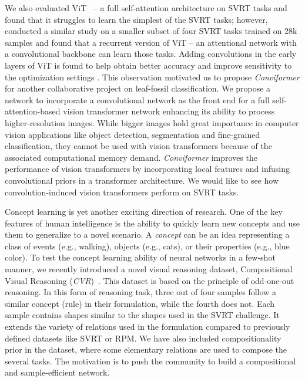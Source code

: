 We also evaluated ViT~\citep{Dosovitskiy2020-iq} -- a full self-attention architecture on SVRT tasks and found that it struggles to learn the simplest of the SVRT tasks; however, \citet{messina2021recurrent} conducted a similar study on a smaller subset of four SVRT tasks trained on 28k samples and found that a recurrent version of ViT -- an attentional network with a convolutional backbone can learn those tasks. Adding convolutions in the early layers of ViT is found to help obtain better accuracy and improve sensitivity to the optimization settings \citep{xiao2021early}. This observation motivated us to propose \textit{Conviformer} \citep{vaishnav2022conviformers} for another collaborative project on leaf-fossil classification. We propose a network to incorporate a convolutional network as the front end for a full self-attention-based vision transformer network enhancing its ability to process higher-resolution images. While bigger images hold great importance in computer vision applications like object detection, segmentation and fine-grained classification, they cannot be used with vision transformers because of the associated computational memory demand. \textit{Conviformer} improves the performance of vision transformers by incorporating local features and infusing convolutional priors in a transformer architecture. We would like to see how convolution-induced vision transformers perform on SVRT tasks. 

Concept learning is yet another exciting direction of research. One of the key features of human intelligence is the ability to quickly learn new concepts and use them to generalize to a novel scenario. A \textit{concept} can be an idea representing a class of events (e.g., walking), objects (e.g., cats), or their properties (e.g., blue color). To test the concept learning ability of neural networks in a few-shot manner, we recently introduced a novel visual reasoning dataset, Compositional Visual Reasoning (\textit{CVR})~\citep{zerroug2022benchmark}. This dataset is based on the principle of odd-one-out reasoning. In this form of reasoning task, three out of four samples follow a similar concept (rule) in their formulation, while the fourth does not. Each sample contains shapes similar to the shapes used in the SVRT challenge. It extends the variety of relations used in the formulation compared to previously defined datasets like SVRT or RPM. We have also included compositionality prior in the dataset, where some elementary relations are used to compose the several tasks. The motivation is to push the community to build a compositional and sample-efficient network.

